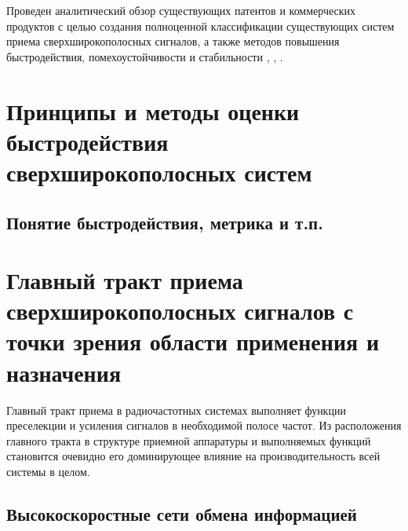 


Проведен аналитический обзор существующих патентов и коммерческих продуктов с целью создания полноценной классификации существующих систем приема сверхширокополосных сигналов, а также методов повышения быстродействия, помехоустойчивости и стабильности \cite{jia_4-bit_2020}, \cite{cheng_introduction_2021, lin_60-ghz_nodate, gray_analysis_2009}, \cite{nagulu_ultra-wideband_2021, rahimpour_design_2019, rucker_013m_2009, pelgrom_matching_1989-1, du_112-gss_2019, hartmann_low-power_2007, saha_6-20_2012, johansen_analysis_2005, shahramian_millimeter-wave_2011, du_256-gss_2018, dyskin_wideband_2016, noauthor_photonic_nodate, noauthor_microwave_2005}.

\section{Принципы и методы оценки быстродействия сверхширокополосных систем}

\subsection{Понятие быстродействия, метрика и т.п.}

\section{Главный тракт приема сверхширокополосных сигналов с точки зрения области применения и назначения}
Главный тракт приема в радиочастотных системах выполняет функции преселекции и усиления сигналов в необходимой полосе частот. Из расположения главного тракта в структуре приемной аппаратуры и выполняемых функций становится очевидно его доминирующее влияние на производительность всей системы в целом.

\subsection{Высокоскоростные сети обмена информацией}

